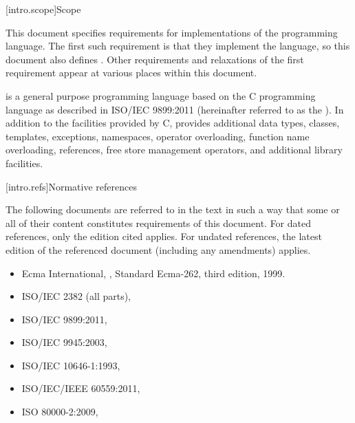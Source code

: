 
[intro.scope]{Scope}

\pnum
{}%
This document specifies requirements for implementations
of the \Cpp programming language. The first such requirement is that
they implement the language, so this document also
defines \Cpp. Other requirements and relaxations of the first
requirement appear at various places within this document.

\pnum
\Cpp is a general purpose programming language based on the C
programming language as described in ISO/IEC 9899:2011
 (hereinafter referred to as the
). In addition to
the facilities provided by C, \Cpp provides additional data types,
classes, templates, exceptions, namespaces, operator
overloading, function name overloading, references, free store
management operators, and additional library facilities.%

%
[intro.refs]{Normative references}

\pnum
{}%
The following documents are referred to in the text
in such a way that some or all of their content
constitutes requirements
of this document. For dated references, only the edition cited applies.
For undated references, the latest edition of the referenced document
(including any amendments) applies.
\begin{itemize}
\item Ecma International, ,
Standard Ecma-262, third edition, 1999.
\item ISO/IEC 2382 (all parts), 
\item ISO/IEC 9899:2011, 
\item ISO/IEC 9945:2003, 
\item ISO/IEC 10646-1:1993, 
\item ISO/IEC/IEEE 60559:2011, 
\item ISO 80000-2:2009, 
\end{itemize}

